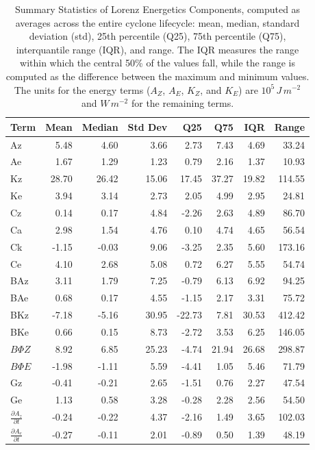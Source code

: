 \documentclass[10pt]{article}
\begin{document}
\begin{table}[!htbp]
\centering
\caption[Summary Statistics of Lorenz Energetics Components]{Summary Statistics of Lorenz Energetics Components, computed as averages across the entire cyclone lifecycle: mean, median, standard deviation (std), 25th percentile (Q25), 75th percentile (Q75), interquantile range (IQR), and range. The IQR measures the range within which the central 50\% of the values fall, while the range is computed as the difference between the maximum and minimum values. The units for the energy terms ($A_Z$, $A_E$, $K_Z$, and $K_E$) are $10^5 \, J \, m^{-2}$ and $W \, m^{-2}$ for the remaining terms.}
\label{tab:lec_stats}
\begin{tabular}{lrrrrrrr}
\toprule
Term & Mean & Median & Std Dev & Q25 & Q75 & IQR & Range \\
\midrule
Az & 5.48 & 4.60 & 3.66 & 2.73 & 7.43 & 4.69 & 33.24 \\
Ae & 1.67 & 1.29 & 1.23 & 0.79 & 2.16 & 1.37 & 10.93 \\
Kz & 28.70 & 26.42 & 15.06 & 17.45 & 37.27 & 19.82 & 114.55 \\
Ke & 3.94 & 3.14 & 2.73 & 2.05 & 4.99 & 2.95 & 24.81 \\
Cz & 0.14 & 0.17 & 4.84 & -2.26 & 2.63 & 4.89 & 86.70 \\
Ca & 2.98 & 1.54 & 4.76 & 0.10 & 4.74 & 4.65 & 56.54 \\
Ck & -1.15 & -0.03 & 9.06 & -3.25 & 2.35 & 5.60 & 173.16 \\
Ce & 4.10 & 2.68 & 5.08 & 0.72 & 6.27 & 5.55 & 54.74 \\
BAz & 3.11 & 1.79 & 7.25 & -0.79 & 6.13 & 6.92 & 94.25 \\
BAe & 0.68 & 0.17 & 4.55 & -1.15 & 2.17 & 3.31 & 75.72 \\
BKz & -7.18 & -5.16 & 30.95 & -22.73 & 7.81 & 30.53 & 412.42 \\
BKe & 0.66 & 0.15 & 8.73 & -2.72 & 3.53 & 6.25 & 146.05 \\
$B\Phi Z$ & 8.92 & 6.85 & 25.23 & -4.74 & 21.94 & 26.68 & 298.87 \\
$B\Phi E$ & -1.98 & -1.11 & 5.59 & -4.41 & 1.05 & 5.46 & 71.79 \\
Gz & -0.41 & -0.21 & 2.65 & -1.51 & 0.76 & 2.27 & 47.54 \\
Ge & 1.13 & 0.58 & 3.28 & -0.28 & 2.28 & 2.56 & 54.50 \\
$\frac{\partial A_z}{\partial t}$ & -0.24 & -0.22 & 4.37 & -2.16 & 1.49 & 3.65 & 102.03 \\
$\frac{\partial A_e}{\partial t}$ & -0.27 & -0.11 & 2.01 & -0.89 & 0.50 & 1.39 & 48.19 \\

\end{tabular}
\end{table}
\end{document}
